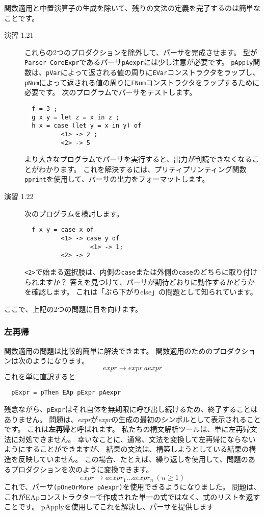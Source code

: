 \documentclass{jarticle}
\begin{document}
関数適用と中置演算子の生成を除いて、残りの文法の定義を完了するのは簡単なことです。

\begin{description}
	\item[演習 1.21] これらの2つのプロダクションを除外して、パーサを完成させます。
		型が\texttt{Parser CoreExpr}であるパーサ\texttt{pAexpr}には少し注意が必要です。
		\texttt{pApply}関数は、\texttt{pVar}によって返される値の周りに\texttt{EVar}コンストラクタをラップし、
		\texttt{pNum}によって返される値の周りに\texttt{ENum}コンストラクタをラップするために必要です。
		次のプログラムでパーサをテストします。

		\begin{verbatim}
  f = 3 ;
  g x y = let z = x in z ;
  h x = case (let y = x in y) of
          <1> -> 2 ;
          <2> -> 5
\end{verbatim}

		より大きなプログラムでパーサを実行すると、出力が判読できなくなることがわかります。
		これを解決するには、プリティプリンティング関数\texttt{pprint}を使用して、パーサの出力をフォーマットします。
	\item[演習 1.22] 次のプログラムを検討します。

		\begin{verbatim}
  f x y = case x of
          <1> -> case y of
                  <1> -> 1;
          <2> -> 2
\end{verbatim}

		\texttt{<2>}で始まる選択肢は、内側の\texttt{case}または外側の\texttt{case}のどちらに取り付けられますか？
		答えを見つけて、パーサが期待どおりに動作するかどうかを確認します。
		これは「ぶら下がりelse」の問題として知られています。
\end{description}

ここで、上記の2つの問題に目を向けます。

\subsubsection{左再帰}

関数適用の問題は比較的簡単に解決できます。
関数適用のためのプロダクションは次のようになります。
\[ expr \rightarrow expr ~ aexpr \]
これを単に直訳すると

\begin{verbatim}
  pExpr = pThen EAp pExpr pAexpr
\end{verbatim}

残念ながら、\texttt{pExpr}はそれ自体を無期限に呼び出し続けるため、終了することはありません。
問題は、\textit{expr}が\textit{expr}の生成の最初のシンボルとして表示されることです。
これは\textbf{左再帰}と呼ばれます。
私たちの構文解析ツールは、単に左再帰文法に対処できません。
幸いなことに、通常、文法を変換して左再帰にならないようにすることができますが、
結果の文法は、構築しようとしている結果の構造を反映していません。
この場合、たとえば、繰り返しを使用して、問題のあるプロダクションを次のように変換できます。
\[ expr \rightarrow aexpr_1 \ldots aexpr_n ~ (n \geq 1) \]
これで、パーサ\texttt{(pOneOrMore pAexpr)}を使用できるようになりました。
問題は、これがEApコンストラクターで作成された単一の式ではなく、式のリストを返すことです。
pApplyを使用してこれを解決し、パーサを提供します
\end{document}

